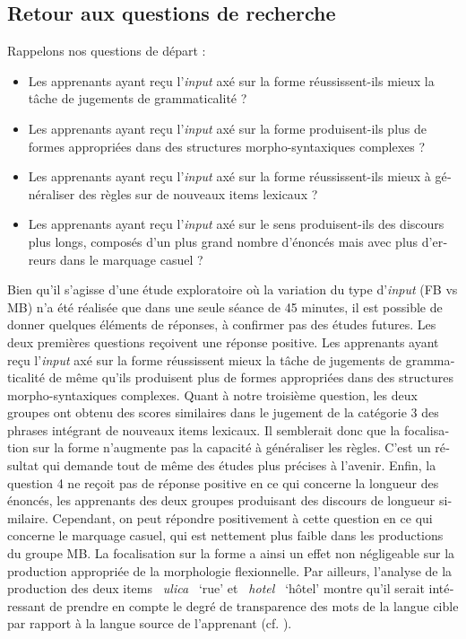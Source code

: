 \documentclass[output=paper]{langscibook}
\begin{document}
\begin{otherlanguage}{french}
\subsection{Retour aux questions de recherche}\label{sec:watorek:5.4}

Rappelons nos questions de départ :

\begin{itemize}
\item Les apprenants ayant reçu l’\textit{input} axé sur la forme réussissent-ils mieux la tâche de jugements de grammaticalité ?
\item Les apprenants ayant reçu l’\textit{input} axé sur la forme produisent-ils plus de formes appropriées dans des structures morpho-syntaxiques complexes ?
\item Les apprenants ayant reçu l’\textit{input} axé sur la forme réussissent-ils mieux à généraliser des règles sur de nouveaux items lexicaux ?
\item Les apprenants ayant reçu l’\textit{input} axé sur le sens produisent-ils des discours plus longs, composés d’un plus grand nombre d’énoncés mais avec plus d’erreurs dans le marquage casuel ? 
\end{itemize}

Bien qu’il s’agisse d’une étude exploratoire où la variation du type d’\textit{input} (FB vs MB) n’a été réalisée que dans une seule séance de 45 minutes, il est possible de donner quelques éléments de réponses, à confirmer pas des études futures. Les deux premières questions reçoivent une réponse positive. Les apprenants ayant reçu l’\textit{input} axé sur la forme réussissent mieux la tâche de jugements de grammaticalité de même qu’ils produisent plus de formes appropriées dans des structures morpho-syntaxiques complexes. Quant à notre troisième question, les deux groupes ont obtenu des scores similaires dans le jugement de la catégorie 3 des phrases intégrant de nouveaux items lexicaux. Il semblerait donc que la focalisation sur la forme n’augmente pas la capacité à généraliser les règles. C’est un résultat qui demande tout de même des études plus précises à l’avenir. Enfin, la question 4 ne reçoit pas de réponse positive en ce qui concerne la longueur des énoncés, les apprenants des deux groupes produisant des discours de longueur similaire. Cependant, on peut répondre positivement à cette question en ce qui concerne le marquage casuel, qui est nettement plus faible dans les productions du groupe MB. La focalisation sur la forme a ainsi un effet non négligeable sur la production appropriée de la morphologie flexionnelle. Par ailleurs, l’analyse de la production des deux items \textit{~ulica~} `rue' et \textit{~hotel~} `hôtel' montre qu’il serait intéressant de prendre en compte le degré de transparence des mots de la langue cible par rapport à la langue source de l’apprenant (cf. \citealt{DimrothEtAl2013}).


\end{otherlanguage}
\end{document}
